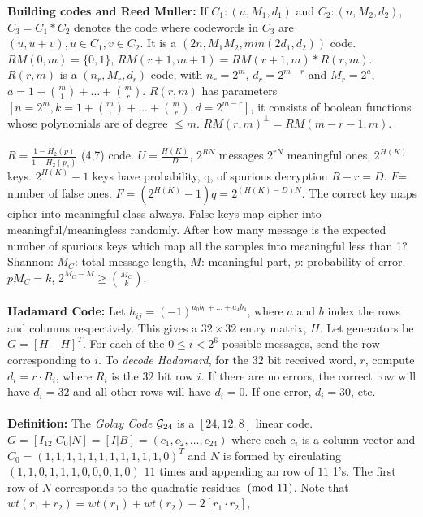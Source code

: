 {\bf Building codes and Reed Muller:} If $C_1 : (n, M_1, d_1 )$ and
$C_2 : (n, M_2, d_2 )$, $C_3 = C_1 * C_2$ denotes the code where codewords
in $C_3$ are $(u, u+v),
u \in  C_1 , v \in  C_2 $.  It is a
$(2n, M_1 M_2 , min(2 d_1 , d_2 ))$ code.
$RM(0,m)= \{ 0 , 1 \}$, $RM(r+1, m+1)=  RM(r+1, m) * R(r, m)$. $R(r, m)$ is
a $(n_r , M_r , d_r )$ code, with $n_r = 2^m$, $d_r = 2^{m-r}$ and
$M_r = 2^a$, $a= 1 + {m \choose 1} + \ldots + {m \choose r}$.  $R(r,m)$
has parameters
$[n=2^m , k= 1 + {m \choose 1} + \ldots + {m \choose r}, d=2^{m-r}]$,
it consists of boolean functions
whose polynomials are of degree 
$\leq m$. $RM(r,m)^{\perp} = RM(m-r-1,
m)$.
\\
\\
$R= \frac {1-H_2 (p)} {1- H_2 (p_e )}$ (4,7) code.
$ U= {\frac {H(K)} {D}}$, $2^{RN}$ messages $2^{rN}$ meaningful ones,
$2^{H(K)}$ keys.  $2^{H(K)}-1$ keys have probability, q, of spurious
decryption $R-r=D$. $F$= number of false ones.
$F=(2^{H(K)}-1)q= 2^{(H(K)-D)N}$.  The correct key maps cipher into
meaningful class always.  False keys map cipher into meaningful/meaningless
randomly.  After how many message is the expected number of spurious keys
which map all the samples into meaningful less than 1?
Shannon: $M_{C}$: total message length, $M$: meaningful part,
$p$: probability of error.  $p M_{C}= k$, $2^{M_{C}-M} \geq
{{M_{C}} \choose {k}}.$\\
\\
{\bf Hadamard Code:}  Let $h_{ij}= (-1)^{a_0 b_0 + \ldots + a_4 b_4}$,
where $a$ and $b$ index the rows and columns respectively.  This gives a
$32 \times 32$ entry matrix, $H$.  Let generators be $G= [H |  -H]^T$.
For each of the $0 \le i <2^6$ possible messages, send the row corresponding to 
$i$.
To \emph {decode Hadamard}, for the $32$ bit received word, $r$, compute $d_i= r \cdot R_i$,
where $R_i$ is the $32$ bit row $i$.  If there are no errors, the correct row will
have $d_i=32$ and all other rows will have $d_i=0$.  If one error, $d_i=30$, etc.
\\
\\
{\bf Definition:} The
\emph{Golay Code} ${\cal G}_{24}$ is a $[24, 12,8]$ linear code. 
$G= [I_{12} | C_0 | N] = [I | B] = (c_1, c_2, \ldots, c_{24})$  where each $c_i$
is  a column vector and $C_0= (1,1,1,1,1,1,1,1,1,1,1,0)^T$
and $N$ is formed by circulating $(1, 1, 0, 1, 1, 1, 0, 0, 0, 1, 0)$
$11$ times and appending an row of $11$ 1's.
The first row of $N$ corresponds to the quadratic residues $\thinspace \textnormal{(mod } 11 \textnormal{)}$.
Note that $wt(r_1 + r_2) = wt(r_1) + wt(r_2) - 2 [r_1 \cdot r_2]$,
